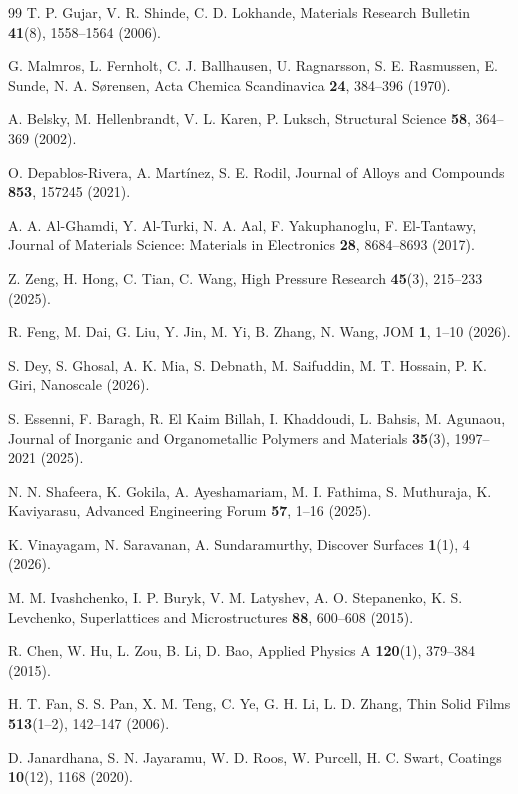 \documentclass[10pt]{NSP1}
\begin{document}
\begin{thebibliography}{99}
 T. P. Gujar, V. R. Shinde, C. D. Lokhande, Materials Research Bulletin \textbf{41}(8), 1558--1564 (2006).

 G. Malmros, L. Fernholt, C. J. Ballhausen, U. Ragnarsson, S. E. Rasmussen, E. Sunde, N. A. S{\o}rensen, Acta Chemica Scandinavica \textbf{24}, 384--396 (1970).

 A. Belsky, M. Hellenbrandt, V. L. Karen, P. Luksch, Structural Science \textbf{58}, 364--369 (2002).

 O. Depablos-Rivera, A. Mart{\'i}nez, S. E. Rodil, Journal of Alloys and Compounds \textbf{853}, 157245 (2021).

 A. A. Al-Ghamdi, Y. Al-Turki, N. A. Aal, F. Yakuphanoglu, F. El-Tantawy, Journal of Materials Science: Materials in Electronics \textbf{28}, 8684--8693 (2017).

 Z. Zeng, H. Hong, C. Tian, C. Wang, High Pressure Research \textbf{45}(3), 215--233 (2025).

 R. Feng, M. Dai, G. Liu, Y. Jin, M. Yi, B. Zhang, N. Wang, JOM \textbf{1}, 1--10 (2026).

 S. Dey, S. Ghosal, A. K. Mia, S. Debnath, M. Saifuddin, M. T. Hossain, P. K. Giri, Nanoscale (2026).

 S. Essenni, F. Baragh, R. El Kaim Billah, I. Khaddoudi, L. Bahsis, M. Agunaou, Journal of Inorganic and Organometallic Polymers and Materials \textbf{35}(3), 1997--2021 (2025).

 N. N. Shafeera, K. Gokila, A. Ayeshamariam, M. I. Fathima, S. Muthuraja, K. Kaviyarasu, Advanced Engineering Forum \textbf{57}, 1--16 (2025).

 K. Vinayagam, N. Saravanan, A. Sundaramurthy, Discover Surfaces \textbf{1}(1), 4 (2026).

 M. M. Ivashchenko, I. P. Buryk, V. M. Latyshev, A. O. Stepanenko, K. S. Levchenko, Superlattices and Microstructures \textbf{88}, 600--608 (2015).

 R. Chen, W. Hu, L. Zou, B. Li, D. Bao, Applied Physics A \textbf{120}(1), 379--384 (2015).

 H. T. Fan, S. S. Pan, X. M. Teng, C. Ye, G. H. Li, L. D. Zhang, Thin Solid Films \textbf{513}(1--2), 142--147 (2006).

 D. Janardhana, S. N. Jayaramu, W. D. Roos, W. Purcell, H. C. Swart, Coatings \textbf{10}(12), 1168 (2020).

\end{thebibliography}
\end{document}
